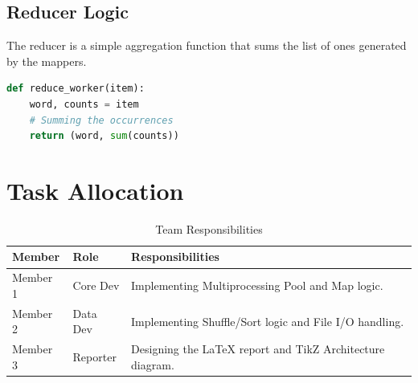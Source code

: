 \documentclass[a4paper,11pt]{article}
\begin{document}
\subsection{Reducer Logic}
The reducer is a simple aggregation function that sums the list of ones generated by the mappers.

\begin{lstlisting}[language=Python, caption=Reducer Logic]
def reduce_worker(item):
    word, counts = item
    # Summing the occurrences
    return (word, sum(counts))
\end{lstlisting}

\section{Task Allocation}
\begin{table}[h]
\centering
\begin{tabular}{|l|l|p{6cm}|}
\hline
\textbf{Member} & \textbf{Role} & \textbf{Responsibilities} \\ \hline
Member 1 & Core Dev & Implementing Multiprocessing Pool and Map logic. \\ \hline
Member 2 & Data Dev & Implementing Shuffle/Sort logic and File I/O handling. \\ \hline
Member 3 & Reporter & Designing the LaTeX report and TikZ Architecture diagram. \\ \hline
\end{tabular}
\caption{Team Responsibilities}
\end{table}
\end{document}
